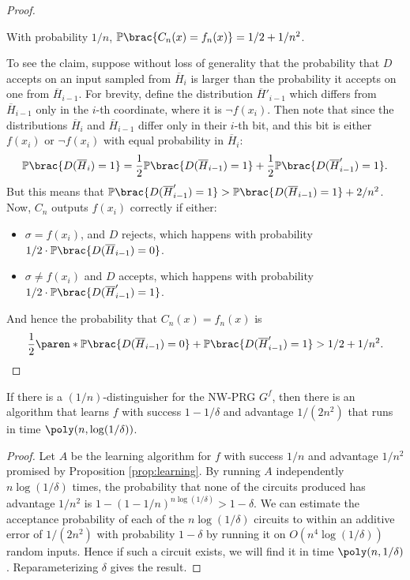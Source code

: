 \begin{proof}
  \begin{claim}
    With probability $1 / n$, $\Pr\brac{C_n(x) = f_n(x)} = 1/2 + 1/n^2$.
  \end{claim}
  To see the claim, suppose without loss of generality that the probability
  that $D$ accepts on an input sampled from $\overline{H}_{i}$ is larger
  than the probability it accepts on one from $\overline{H}_{i - 1}$.
  For brevity, define the distribution $\overline{H}'_{i - 1}$ which differs
  from $\overline{H}_{i - 1}$ only in the $i$-th coordinate, where it is
  $\lnot f(x_i)$.
  Then note that since the distributions $\overline{H}_i$ and
  $\overline{H}_{i - 1}$ differ only in their $i$-th bit, and this bit is
  either $f(x_i)$ or $\lnot f(x_i)$ with equal probability in
  $\overline{H}_i$:
  \[
    \Pr\brac{D(\overline{H}_{i}) = 1}
    = \frac 12 \Pr\brac{D(\overline{H}_{i - 1}) = 1}
    + \frac 12 \Pr\brac{D(\overline{H}'_{i - 1}) = 1}.
  \]
  But this means that $\Pr\brac{D(\overline{H}'_{i - 1}) = 1} >
  \Pr\brac{D(\overline{H}_{i - 1}) = 1} + 2/n^2$.
  Now, $C_n$ outputs $f(x_i)$ correctly if either:
  \begin{itemize}
    \item $\sigma = f(x_i)$, and $D$ rejects, which happens with
      probability $1/2 \cdot \Pr\brac{D(\overline{H}_{i - 1}) = 0}$.
    \item $\sigma \neq f(x_i)$ and $D$ accepts, which happens with
      probability $1/2 \cdot \Pr\brac{D(\overline{H}'_{i - 1}) = 1}$.
  \end{itemize}
  And hence the probability that $C_n(x) = f_n(x)$ is
  \[
    \frac 12 \paren*{
      \Pr\brac{D(\overline{H}_{i - 1}) = 0} +
      \Pr\brac{D(\overline{H}'_{i - 1}) = 1}
      }
      > 1/2 + 1/n^2.
    \]
\end{proof}

\begin{corollary}
  \label{corr:learning-boost-success}
  If there is a $(1/n)$-distinguisher for the NW-PRG $G^f$, then there is an
  algorithm that learns $f$ with success $1 - 1/\delta$ and advantage
  $1/(2n^2)$ that runs in time $\poly(n, \log(1/\delta))$.
\end{corollary}

\begin{proof}
  Let $A$ be the learning algorithm for $f$ with success $1/n$ and advantage
  $1/n^2$ promised by Proposition \ref{prop:learning}. By running $A$
  independently $n \log(1/\delta)$ times, the probability that none of the
  circuits produced has advantage $1/n^2$ is $1 - (1 - 1/n)^{n\log(1/\delta)} >
  1 - \delta$. We can estimate the acceptance probability of each of the
  $n\log(1/\delta)$ circuits to within an additive error of $1/(2n^2)$ with
  probability $1 - \delta$ by running it on $O(n^4 \log(1/\delta))$ random
  inputs. Hence if such a circuit exists, we will find it in time $\poly(n,
  1/\delta)$. Reparameterizing $\delta$ gives the result.
\end{proof}

